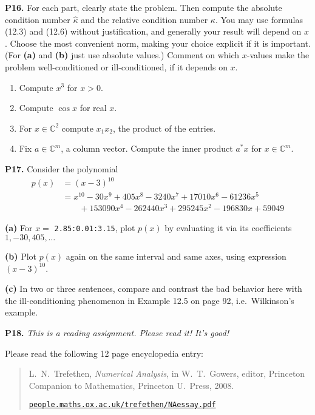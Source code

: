 \documentclass[12pt,dvipsnames]{amsart}
\newcommand{\CC}{\mathbb{C}}
\newcommand{\prob}[1]{\bigskip\noindent\textbf{#1.}\quad }
\newcommand{\epart}[1]{\medskip\noindent\textbf{(#1)}\quad }
\begin{document}
\medskip
\prob{P16}  For each part, clearly state the problem.  Then compute the absolute condition number $\hat\kappa$ and the relative condition number $\kappa$.  You may use formulas (12.3) and (12.6) without justification, and generally your result will depend on $x$.  Choose the most convenient norm, making your choice explicit if it is important.  (For \textbf{(a)} and \textbf{(b)} just use absolute values.)  Comment on which $x$-values make the problem well-conditioned or ill-conditioned, if it depends on $x$.
\renewcommand{\labelenumi}{\textbf{(\alph{enumi})}}
\begin{enumerate}
\item Compute $x^3$ for $x>0$.
\item Compute $\cos x$ for real $x$.
\item For $x\in\CC^2$ compute $x_1x_2$, the product of the entries.
\item Fix $a\in\CC^m$, a column vector.  Compute the inner product $a^*x$ for $x\in \CC^m$.
\end{enumerate}


\prob{P17}  Consider the polynomial
\begin{align*}
p(x) &= (x-3)^{10} \\
     &= x^{10} - 30 x^9 + 405 x^8 - 3240 x^7 + 17010 x^6 - 61236 x^5 \\
     &\qquad   + 153090 x^4 - 262440 x^3 + 295245 x^2 - 196830 x + 59049
\end{align*}

\epart{a} For $x=$ \small\verb|2.85:0.01:3.15|\normalsize, plot $p(x)$ by evaluating it via its coefficients $1,-30,405,\dots$

\epart{b} Plot $p(x)$ again on the same interval and same axes, using expression $(x-3)^{10}$.

\epart{c} In two or three sentences, compare and contrast the bad behavior here with the ill-conditioning phenomenon in Example 12.5 on page 92, i.e.~Wilkinson's example.


\prob{P18}  \emph{This is a reading assignment.  Please read it!  It's good!}

\medskip
\noindent Please read the following 12 page encyclopedia entry:

\medskip
\begin{quote}
L.~N.~Trefethen, \emph{Numerical Analysis}, in W.~T.~Gowers, editor, Princeton Companion to Mathematics, Princeton U.~Press, 2008.

\href{https://people.maths.ox.ac.uk/trefethen/NAessay.pdf}{\texttt{people.maths.ox.ac.uk/trefethen/NAessay.pdf}}
\end{quote}
\end{document}

